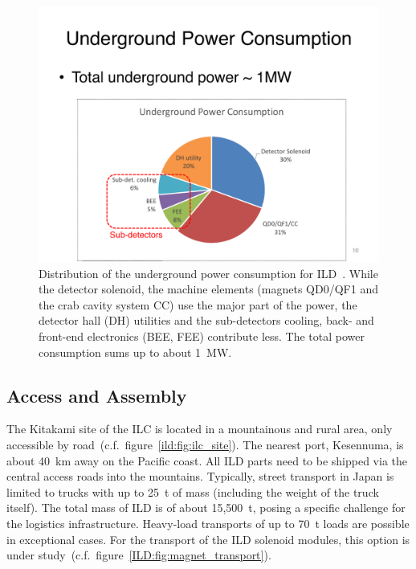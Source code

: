 \begin{figure}[h!]
\includegraphics[width=0.7\hsize]{Integration/fig/Power.pdf}
\caption{\label{fig:integration:power}Distribution of the underground power consumption for ILD~\cite{ild:bib:services}. While the detector solenoid, the machine elements (magnets QD0/QF1 and the crab cavity system CC) use the major part of the power, the detector hall (DH) utilities and the sub-detectors cooling, back- and front-end electronics (BEE, FEE) contribute less. The total power consumption sums up to about 1~MW.}
\end{figure}
\vspace{2cm}
\FloatBarrier

\subsection{Access and Assembly}
\label{ild:sec:access}
The Kitakami site of the ILC is located in a mountainous and rural area, only accessible by road~(c.f.~figure~\ref{ild:fig:ilc_site}). The nearest port, Kesennuma, is about 40~km away on the Pacific coast. All ILD parts need to be shipped via the central access roads into the mountains. Typically, street transport in Japan is limited to trucks with up to 25~t of mass (including the weight of the truck itself). The total mass of ILD is of about 15,500~t, posing a specific challenge for the logistics infrastructure. Heavy-load transports of up to 70~t loads are possible in exceptional cases. For the transport of the ILD solenoid modules, this option is under study~(c.f.~figure~\ref{ILD:fig:magnet_transport}).

